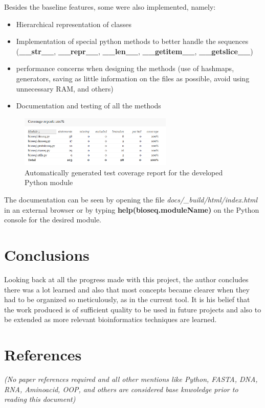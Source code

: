 \documentclass[11pt]{article}
\begin{document}
Besides the baseline features, some were also implemented, namely:
\begin{itemize}
    \itemsep0em 
    \item Hierarchical representation of classes
    \item Implementation of special python methods to better handle the sequences (\textbf{\_\_str\_\_}, \textbf{\_\_repr\_\_}, \textbf{\_\_len\_\_}, \textbf{\_\_getitem\_\_}, \textbf{\_\_getslice\_\_})
    \item performance concerns when designing the methods (use of hashmaps, generators, saving as little information on the files as possible, avoid using unnecessary RAM, and others)
    \item Documentation and testing of all the methods
\end{itemize}
\begin{figure}[h!]
    \centering
    \includegraphics[width=0.65\textwidth]{coverageReport.png}
    \caption{Automatically generated test coverage report for the developed Python module}
    \label{fig:coverageReport}
\end{figure}

The documentation can be seen by opening the file \textit{docs/\_build/html/index.html} in an external browser or by typing \textbf{help(bioseq.moduleName)} on the Python console for the desired module. 


\section{Conclusions}
Looking back at all the progress made with this project, the author concludes there was a lot learned and also that most concepts became clearer when they had to be organized so meticulously, as in the current tool. It is his belief that the work produced is of sufficient quality to be used in future projects and also to be extended as more relevant bioinformatics techniques are learned.

\section{References}
\textit{(No paper references required and all other mentions like Python, FASTA, DNA, RNA, Aminoacid, OOP, and others are considered base knwoledge prior to reading this document)}
\end{document}

